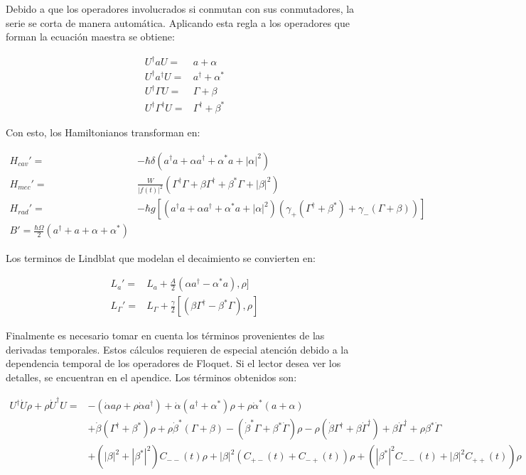 \documentclass[a4paper,10pt]{report}
\begin{document}
Debido a que los operadores involucrados si conmutan con sus conmutadores, la serie se corta de manera automática. Aplicando esta regla a los operadores que forman la ecuación maestra se obtiene:

\begin{align}
U^{\dagger} a U =& a + \alpha \\
U^{\dagger} a^{\dagger} U =& a^{\dagger} + \alpha^* \\
U^{\dagger} \Gamma U =& \Gamma + \beta \\
U^{\dagger} \Gamma^{\dagger} U =& \Gamma^{\dagger} + \beta^* 
\end{align} 
 
Con esto, los Hamiltonianos transforman en:

\begin{align}
H_{cav}' =& -\hbar \delta(a^{\dagger}a +\alpha a^{\dagger}+\alpha^* a + |\alpha|^2)\\
H_{mec}' =& \frac{W}{|f(t)|^2}(\Gamma^{\dagger}\Gamma + \beta \Gamma^{\dagger} + \beta^* \Gamma + |\beta|^2 )\\
H_{rad}'=&-\hbar g[(a^{\dagger}a +\alpha a^{\dagger}+\alpha^* a + |\alpha|^2)(\gamma_+(\Gamma^{\dagger}+\beta^*)+\gamma_-(\Gamma+\beta))]\\
B' = \frac{\hbar \Omega}{2}(a^{\dagger} + a +\alpha + \alpha^*)
\end{align}

Los terminos de Lindblat que modelan el decaimiento se convierten en:

\begin{align}
L_a ' =& L_a + \frac{A}{2}(\alpha a^\dagger - \alpha^*a),\rho] \\
L_{\Gamma}' =& L_{\Gamma} + \frac{\gamma}{2}[(\beta\Gamma^{\dagger}-\beta^* \Gamma),\rho]
\end{align}

Finalmente es necesario tomar en cuenta los términos provenientes de las derivadas temporales. Estos cálculos requieren de especial atención debido a la dependencia temporal de los operadores de Floquet. Si el lector desea ver los detalles, se encuentran en el apendice. Los términos obtenidos son:

\begin{align*}
U^{\dagger}\dot{U}\rho + \rho \dot{U}^\dagger U =& -(\dot{\alpha}a \rho + \rho\dot{\alpha}a^{\dagger}) + \dot{\alpha}(a^{\dagger}+\alpha^*)\rho + \rho \dot{\alpha}^*(a+\alpha)\\
&+ \dot{\beta}(\Gamma^{\dagger}+\beta^*)\rho + \rho\dot{\beta}^*(\Gamma + \beta)-(\dot{\beta}^*\Gamma + \beta^*\dot{\Gamma})\rho - \rho(\dot{\beta} \Gamma^{\dagger} + \beta \dot{\Gamma}^{\dagger}) +\beta \dot{\Gamma}^{\dagger} + \rho\beta^* \dot{\Gamma}\\\
&+(|\beta|^2+|\beta^*|^2)C_{--}(t)\rho + |\beta|^2(C_{+-}(t) + C_{-+}(t))\rho + (|\beta^*|^2C_{--}(t) + |\beta|^2C_{++}(t))\rho
\end{align*} 
\end{document}
